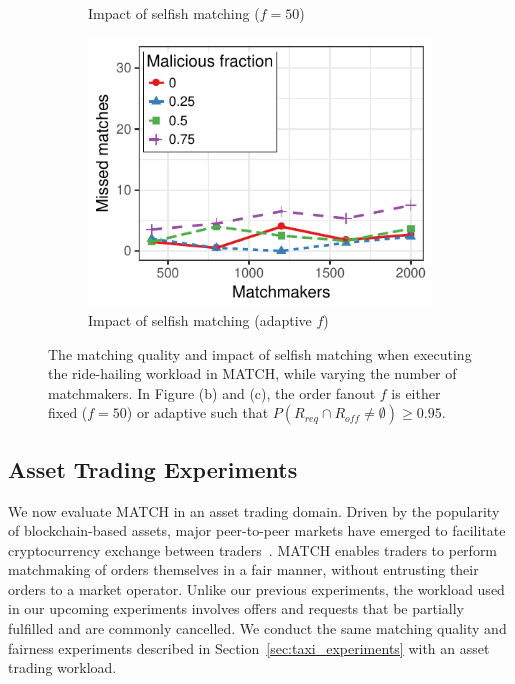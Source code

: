 \begin{figure}[t!]
\begin{subfigure}{.5\columnwidth}
		\caption{Impact of selfish matching ($ f = 50 $)}
		\label{fig:asset_trading_fairness_fixed}
	\end{subfigure}
	\begin{subfigure}{.5\columnwidth}
		\centering
		\includegraphics[width=\columnwidth]{match/assets/plots/asset_trading_fairness_adaptive.pdf}
		\caption{Impact of selfish matching (adaptive $ f $)}
		\label{fig:asset_trading_fairness_adaptive}
	\end{subfigure}
	\caption{The matching quality and impact of selfish matching when executing the ride-hailing workload in MATCH, while varying the number of matchmakers. In Figure (b) and (c), the order fanout $ f $ is either fixed  ($ f = 50 $) or adaptive such that $ P(R_{req} \cap R_{off} \neq \emptyset) \geq 0.95 $.}
	\label{fig:asset_trading_experiments}
\end{figure}

\subsection{Asset Trading Experiments}
\label{sec:asset_trading_experiments}
We now evaluate MATCH in an asset trading domain.
Driven by the popularity of blockchain-based assets, major peer-to-peer markets have emerged to facilitate cryptocurrency exchange between traders~\cite{bentov2019tesseract}.
MATCH enables traders to perform matchmaking of orders themselves in a fair manner, without entrusting their orders to a market operator.
Unlike our previous experiments, the workload used in our upcoming experiments involves offers and requests that be partially fulfilled and are commonly cancelled.
We conduct the same matching quality and fairness experiments described in Section~\ref{sec:taxi_experiments} with an asset trading workload. %


